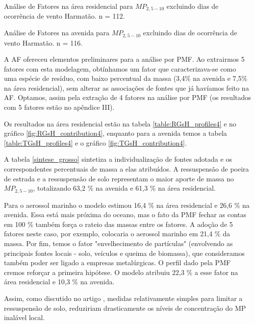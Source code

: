 \newpage
\begin{table}[H]
  \centering
  
  \caption{Análise de Fatores na área residencial para $MP_{2,5-10}$
           excluindo dias de ocorrência de vento Harmatão. n = 112.
          \label{table:AF_RGsH5}}
\end{table}

\begin{table}[H]
  \centering
  
  \caption{Análise de Fatores na avenida para $MP_{2,5-10}$
           excluindo dias de ocorrência de vento Harmatão. n = 116.
          \label{table:AF_TGsH5}}
\end{table}
\newpage

A AF ofereceu elementos preliminares para a análise por PMF. Ao extrairmos 
5 fatores com esta modelagem, obtínhamos um fator que caracterizava-se como uma 
espécie de resíduo, com baixo percentual da massa (3,4\% na avenida e 
7,5\% na área residencial), sem alterar as associações de fontes que já havíamos
feito na AF. Optamos, assim pela extração de 4 fatores na análise por PMF 
(os resultados com 5 fatores estão no apêndice III). 

Os resultados na área residencial estão na tabela \ref{table:RGsH_profiles4} e
no gráfico \ref{fig:RGsH_contribution4}, enquanto para a avenida temos a 
tabela \ref{table:TGsH_profiles4} e o gráfico \ref{fig:TGsH_contribution4}. 

A tabela \ref{sintese_grosso} sintetiza a individualização de fontes 
adotada e os correspondentes percentuais de massa a elas atribuídos. 
A ressuspensão de poeira de estrada e a ressuspensão de solo representam o 
maior aporte de massa no $MP_{2,5-10}$, totalizando 63,2 \% na avenida e 61,3 \%
na área residencial. 

Para o aerossol marinho o modelo estimou 16,4 \% na 
área residencial e 26,6 \% na avenida. Essa está mais próxima do oceano, 
mas o fato da PMF fechar as contas em 100 \% também força o rateio das massas 
entre os fatores. A adoção de 5 fatores neste caso, por exemplo, colocaria o 
aerossol marinho em 21,4 \% da massa. Por fim, temos o fator "envelhecimento de 
partículas" (envolvendo as principais fontes locais - solo, veículos e queima 
de biomassa), que consideramos também poder ser ligado a empresas metalúrgicas. 
O perfil dado pela PMF cremos reforçar a primeira hipótese. O modelo atribuiu 
22,3 \% a esse fator na área residencial e 10,3 \% na avenida.%

Assim, como discutido no artigo \citet{zhou2013}, medidas relativamente simples 
para limitar a ressuspensão de solo, 
reduziriam drasticamente os níveis de concentração do MP inalável local.

